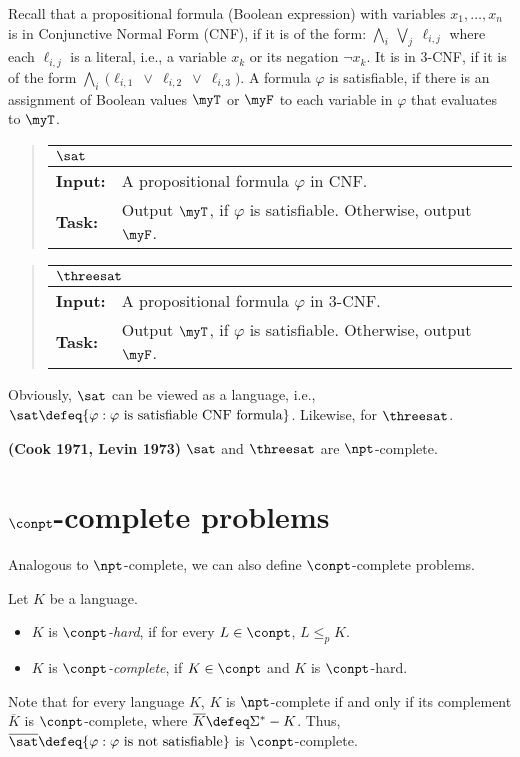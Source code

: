 \documentclass[11pt, a4paper]{article}
\begin{document}
Recall that a propositional formula (Boolean expression) with variables $x_1,\ldots,x_n$
is in Conjunctive Normal Form (CNF), if
it is of the form:
$\bigwedge_{i}\ \bigvee_j \ \ell_{i,j}$
where each $\ell_{i,j}$ is a literal, i.e., a variable $x_k$ or its negation $\neg x_k$.
It is in 3-CNF,
if it is of the form
$\bigwedge_{i}\ \big(\ell_{i,1} \ \vee \ \ell_{i,2} \ \vee \ \ell_{i,3}\big)$.
A formula $\varphi$ is satisfiable, if there is an assignment of Boolean values $\myT$ or $\myF$
to each variable in $\varphi$ that evaluates to $\myT$.

\begin{quote}
{\def\arraystretch{1.25}
\begin{tabular}{|ll|}
\hline
\multicolumn{2}{|l|}{$\sat$}
\\
\hline
\hline
{\bf Input:}
&
A propositional formula $\varphi$ in CNF.
\\
{\bf Task:}
&
Output $\myT$, if 
$\varphi$ is satisfiable.
Otherwise, output $\myF$.
\\
\hline
\end{tabular}}
\end{quote}
\begin{quote}
{\def\arraystretch{1.25}
\begin{tabular}{|ll|}
\hline
\multicolumn{2}{|l|}{$\threesat$}
\\
\hline\hline
{\bf Input:}
&
A propositional formula $\varphi$ in 3-CNF.
\\
{\bf Task:}
&
Output $\myT$, if 
$\varphi$ is satisfiable.
Otherwise, output $\myF$.
\\
\hline
\end{tabular}}
\end{quote}
Obviously, $\sat$ can be viewed as a language, i.e.,
$\sat \defeq \{\varphi : \varphi \ \text{is satisfiable CNF formula}\}$.
Likewise, for $\threesat$.

\begin{theorem}
{\bf (Cook 1971, Levin 1973)}
$\sat$ and $\threesat$ are $\npt$-complete.
\end{theorem}


\section{$\conpt$-complete problems}
\label{app:sec:conp}

Analogous to $\npt$-complete,
we can also define $\conpt$-complete problems.
\begin{definition}
\label{def:conp-complete}
Let $K$ be a language.
\begin{itemize}
\item 
$K$ is {\em $\conpt$-hard}, if
for every $L \in \conpt$, $L \leq_p K$.
\item
$K$ is {\em $\conpt$-complete},
if $K \in \conpt$ and $K$ is $\conpt$-hard.
\end{itemize}
\end{definition}

Note that for every language $K$,
$K$ is $\npt$-complete if and only if its complement $\overline{K}$ is $\conpt$-complete,
where $\overline{K}\defeq\Sigma^*-K$.
Thus, $\overline{\sat}\defeq \{\varphi : \varphi \ \text{is not satisfiable}\}$ is $\conpt$-complete.




 
\end{document}
